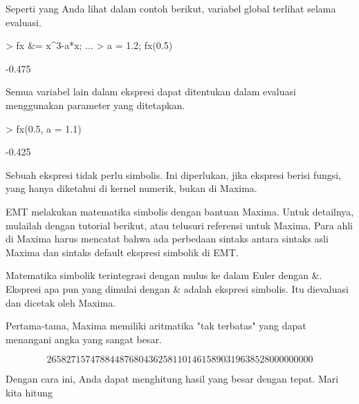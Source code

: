 \documentclass[a4paper,10pt]{article}
\begin{document}
\begin{eulernotebook}
\begin{eulercomment}
\begin{eulercomment}
\begin{eulercomment}
Seperti yang Anda lihat dalam contoh berikut, variabel global terlihat
selama evaluasi.
\end{eulercomment}
\begin{eulerprompt}
> fx &= x^3-a*x; ...
> a = 1.2; fx(0.5)
\end{eulerprompt}
\begin{euleroutput}
  -0.475
\end{euleroutput}
\begin{eulercomment}
Semua variabel lain dalam ekspresi dapat ditentukan dalam evaluasi
menggunakan parameter yang ditetapkan.
\end{eulercomment}
\begin{eulerprompt}
> fx(0.5, a = 1.1)
\end{eulerprompt}
\begin{euleroutput}
  -0.425
\end{euleroutput}
\begin{eulercomment}
Sebuah ekspresi tidak perlu simbolis. Ini diperlukan, jika ekspresi
berisi fungsi, yang hanya diketahui di kernel numerik, bukan di
Maxima.

\begin{eulercomment}
\begin{eulercomment}
EMT melakukan matematika simbolis dengan bantuan Maxima. Untuk
detailnya, mulailah dengan tutorial berikut, atau telusuri referensi
untuk Maxima. Para ahli di Maxima harus mencatat bahwa ada perbedaan
sintaks antara sintaks asli Maxima dan sintaks default ekspresi
simbolik di EMT.

Matematika simbolik terintegrasi dengan mulus ke dalam Euler dengan \&.
Ekspresi apa pun yang dimulai dengan \& adalah ekspresi simbolis. Itu
dievaluasi dan dicetak oleh Maxima.

Pertama-tama, Maxima memiliki aritmatika "tak terbatas" yang dapat
menangani angka yang sangat besar.
\end{eulercomment}
\begin{eulerformula}
\[
2658271574788448768043625811014615890319638528000000000
\]
\end{eulerformula}
\begin{eulercomment}
Dengan cara ini, Anda dapat menghitung hasil yang besar dengan tepat.
Mari kita hitung


\end{eulercomment}
\end{eulercomment}
\end{eulercomment}
\end{eulercomment}
\end{eulercomment}
\end{eulernotebook}
\end{document}
